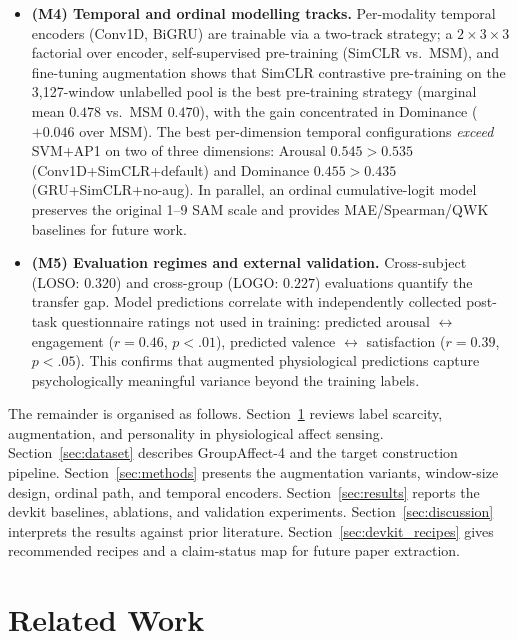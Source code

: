 \documentclass[sigconf,review,anonymous]{acmart}
\begin{document}
\begin{itemize}[leftmargin=1.2em,topsep=2pt,itemsep=1pt]
  \item \textbf{(M4) Temporal and ordinal modelling tracks.}
    Per-modality temporal encoders (Conv1D, BiGRU) are trainable via a
    two-track strategy; a $2{\times}3{\times}3$ factorial over encoder,
    self-supervised pre-training (SimCLR vs.\ MSM), and fine-tuning
    augmentation shows that SimCLR contrastive pre-training on the 3{,}127-window
    unlabelled pool is the best pre-training strategy (marginal mean
    $0.478$ vs.\ MSM $0.470$), with the gain concentrated in Dominance
    ($+0.046$ over MSM).
    The best per-dimension temporal configurations \emph{exceed} SVM+AP1 on
    two of three dimensions: Arousal $0.545 > 0.535$ (Conv1D+SimCLR+default)
    and Dominance $0.455 > 0.435$ (GRU+SimCLR+no-aug).
    In parallel, an ordinal cumulative-logit model preserves the original
    1--9 SAM scale and provides MAE/Spearman/QWK baselines for future work.

  \item \textbf{(M5) Evaluation regimes and external validation.}
    Cross-subject (LOSO: $0.320$) and cross-group (LOGO: $0.227$)
    evaluations quantify the transfer gap.
    Model predictions correlate with independently collected post-task
    questionnaire ratings not used in training:
    predicted arousal $\leftrightarrow$ engagement ($r{=}0.46$, $p{<}.01$),
    predicted valence $\leftrightarrow$ satisfaction ($r{=}0.39$, $p{<}.05$).
    This confirms that augmented physiological predictions capture
    psychologically meaningful variance beyond the training labels.

\end{itemize}

The remainder is organised as follows.
Section~\ref{sec:related} reviews label scarcity, augmentation, and
personality in physiological affect sensing.
Section~\ref{sec:dataset} describes GroupAffect-4 and the target
construction pipeline.
Section~\ref{sec:methods} presents the augmentation variants, window-size
design, ordinal path, and temporal encoders.
Section~\ref{sec:results} reports the devkit baselines, ablations, and
validation experiments.
Section~\ref{sec:discussion} interprets the results against prior literature.
Section~\ref{sec:devkit_recipes} gives recommended recipes and a claim-status
map for future paper extraction.

\section{Related Work}
\label{sec:related}
\end{document}
